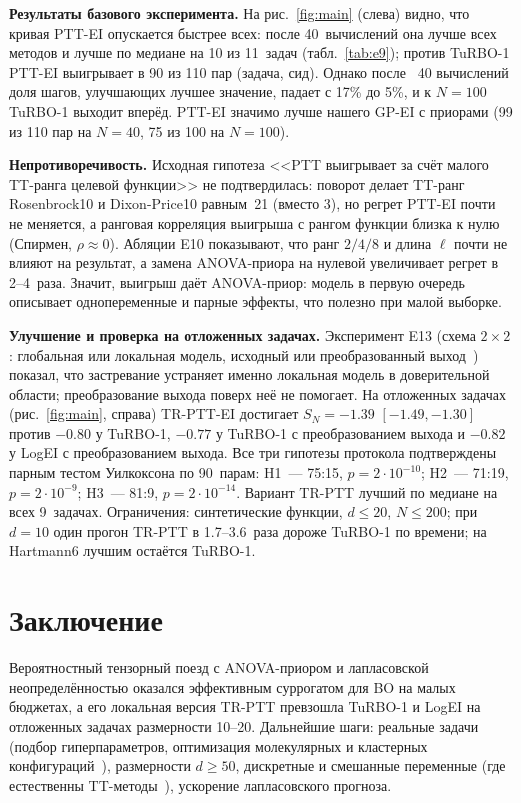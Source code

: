 \documentclass[11pt,a4paper]{article}
\begin{document}
\textbf{Результаты базового эксперимента.} На рис.~\ref{fig:main} (слева) видно, что кривая PTT-EI
опускается быстрее всех: после 40~вычислений она лучше всех методов и лучше по медиане на 10 из 11~задач
(табл.~\ref{tab:e9}); против TuRBO-1 PTT-EI выигрывает в 90 из 110 пар (задача, сид). Однако после ~40
вычислений доля шагов, улучшающих лучшее значение, падает с 17\% до 5\%, и к $N=100$ TuRBO-1 выходит вперёд.
PTT-EI значимо лучше нашего GP-EI с приорами (99 из 110 пар на $N=40$, 75 из 100 на $N=100$).

\textbf{Непротиворечивость.} Исходная гипотеза <<PTT выигрывает за счёт малого TT-ранга целевой функции>>
не подтвердилась: поворот делает TT-ранг Rosenbrock10 и Dixon-Price10 равным~21 (вместо 3), но регрет
PTT-EI почти не меняется, а ранговая корреляция выигрыша с рангом функции близка к нулю (Спирмен,
$\rho\approx0$). Абляции E10 показывают, что ранг $2/4/8$ и длина $\ell$ почти не влияют на результат,
а замена ANOVA-приора на нулевой увеличивает регрет в 2--4~раза. Значит, выигрыш даёт ANOVA-приор:
модель в первую очередь описывает однопеременные и парные эффекты, что полезно при малой выборке.

\textbf{Улучшение и проверка на отложенных задачах.} Эксперимент E13 (схема $2\times2$: глобальная или
локальная модель, исходный или преобразованный выход~\cite{cowenrivers2022hebo}) показал, что застревание
устраняет именно локальная модель в доверительной области; преобразование выхода поверх неё не помогает.
На отложенных задачах (рис.~\ref{fig:main}, справа) TR-PTT-EI достигает $S_N=-1.39$ $[-1.49,-1.30]$ против
$-0.80$ у TuRBO-1, $-0.77$ у TuRBO-1 с преобразованием выхода и $-0.82$ у LogEI с преобразованием выхода.
Все три гипотезы протокола подтверждены парным тестом Уилкоксона по 90~парам: H1~--- 75:15,
$p=2\cdot10^{-10}$; H2~--- 71:19, $p=2\cdot10^{-9}$; H3~--- 81:9, $p=2\cdot10^{-14}$. Вариант TR-PTT лучший
по медиане на всех 9~задачах. Ограничения: синтетические функции, $d\le20$, $N\le200$; при $d=10$ один прогон
TR-PTT в 1.7--3.6~раза дороже TuRBO-1 по времени; на Hartmann6 лучшим остаётся TuRBO-1.

\section{Заключение}
Вероятностный тензорный поезд с ANOVA-приором и лапласовской неопределённостью оказался эффективным
суррогатом для BO на малых бюджетах, а его локальная версия TR-PTT превзошла TuRBO-1 и LogEI на отложенных
задачах размерности 10--20. Дальнейшие шаги: реальные задачи (подбор гиперпараметров, оптимизация
молекулярных и кластерных конфигураций~\cite{sozykin2026clusters}), размерности $d\ge50$, дискретные и смешанные
переменные (где естественны TT-методы~\cite{ryzhakov2023constructive,batsheva2023protes}), ускорение
лапласовского прогноза.



\end{document}
